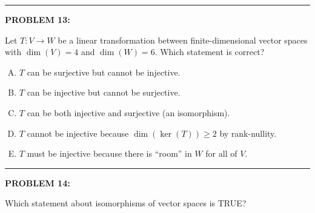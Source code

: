 \documentclass[12pt]{amsart}
\newcommand{\divider}{
  \vspace{-1em} %
  \noindent
  \raisebox{-0.15ex}{\textbullet}%
  \hspace{0.5em}%
  \rule[0.5ex]{0.95\textwidth}{1.0pt}%
  \hspace{0.5em}%
  \raisebox{-0.15ex}{\textbullet}%
  \vspace{0em} %
}
\begin{document}
\divider


\newpage


{\bf PROBLEM 13:}

Let $T: V \to W$ be a linear transformation between finite-dimensional vector spaces with $\dim(V) = 4$ and $\dim(W) = 6$. Which statement is correct?

\begin{enumerate}[(A)]
\item $T$ can be surjective but cannot be injective.
\item $T$ can be injective but cannot be surjective.
\item $T$ can be both injective and surjective (an isomorphism).
\item $T$ cannot be injective because $\dim(\ker(T)) \geq 2$ by rank-nullity.
\item $T$ must be injective because there is ``room'' in $W$ for all of $V$.
\end{enumerate}


\divider

{\bf PROBLEM 14:}

Which statement about isomorphisms of vector spaces is TRUE?
\end{document}
